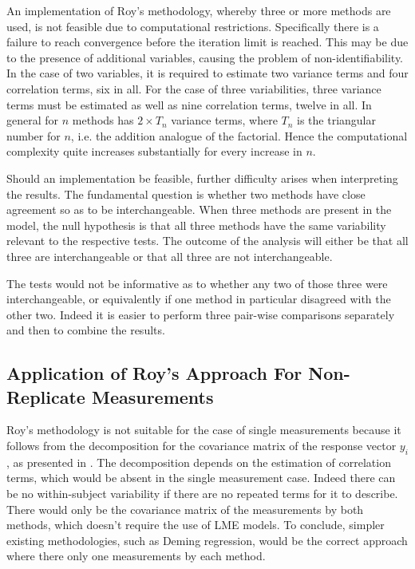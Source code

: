 \documentclass[12pt, a4paper]{report}
\theoremstyle{plain}
\theoremstyle{definition}
\theoremstyle{remark}
\begin{document}
An implementation of Roy's methodology, whereby three or more methods are used, is not feasible due to computational restrictions. Specifically there is a failure to reach convergence before the iteration limit is reached. This may be due to the presence of additional variables, causing the problem of non-identifiability. In the case of two variables, it is required to estimate two variance terms and four correlation terms, six in all. For the case of three variabilities, three variance terms must be estimated as well as nine correlation terms, twelve in all. In general for $n$ methods has $2 \times T_{n}$ variance terms, where $T_n$ is the triangular number for $n$, i.e. the addition analogue of the factorial. Hence the computational complexity quite increases substantially for every increase in $n$.
		
Should an implementation be feasible, further difficulty arises when interpreting the results. The fundamental question is whether two methods have close agreement so as to be interchangeable. When three methods are present in the model, the null hypothesis is that all three methods have the same variability relevant to the respective tests. The outcome of the analysis will either be that all three are interchangeable or that all three are not interchangeable.
		
The tests would not be informative as to whether any two of those three were interchangeable, or equivalently if one method in particular disagreed with the other two. Indeed it is easier to perform three pair-wise comparisons separately and then to combine the results.
		

		
		\subsection{Application of Roy's Approach For Non-Replicate Measurements}
		
		Roy's methodology is not suitable for the case of single measurements because it follows from the decomposition for the covariance matrix of the response vector $y_{i}$, as presented in \citet{hamlett}. The decomposition depends on the estimation of correlation terms, which would be absent in the single measurement case. Indeed there can be no within-subject variability if there are no repeated terms for it to describe. There would only be the covariance matrix of the measurements by both methods, which doesn't require the use of LME models. To conclude, simpler existing methodologies, such as Deming regression, would be the correct approach where there only one measurements by each method.
		
\end{document}
